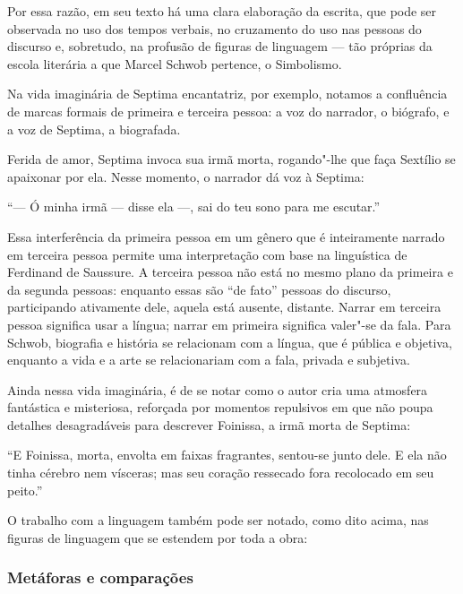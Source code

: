 \documentclass[12pt]{extarticle}
\begin{document}
Por essa razão, em seu texto há uma clara elaboração da escrita, que
pode ser observada no uso dos tempos verbais, no cruzamento do uso nas
pessoas do discurso e, sobretudo, na profusão de figuras de linguagem --- tão próprias da escola literária a que Marcel Schwob pertence, o
Simbolismo.

Na vida imaginária de Septima encantatriz, por exemplo, notamos a
confluência de marcas formais de primeira e terceira pessoa: a voz do narrador, o
biógrafo, e a voz de Septima, a biografada.

Ferida de amor, Septima invoca sua irmã morta, rogando"-lhe que faça
Sextílio se apaixonar por ela. Nesse momento, o narrador dá voz à
Septima:

\smallskip
``--- Ó minha irmã --- disse ela ---, sai do teu sono para me escutar.''
\smallskip

Essa interferência da primeira pessoa em um gênero que é inteiramente
narrado em terceira pessoa permite uma interpretação com base na
linguística de Ferdinand de Saussure. A terceira pessoa não está no
mesmo plano da primeira e da segunda pessoas: enquanto essas são ``de
fato'' pessoas do discurso, participando ativamente dele, aquela está
ausente, distante. Narrar em terceira pessoa significa usar a língua;
narrar em primeira significa valer"-se da fala. Para Schwob, biografia e
história se relacionam com a língua, que é pública e objetiva, enquanto
a vida e a arte se relacionariam com a fala, privada e subjetiva.

Ainda nessa vida imaginária, é de se notar como o autor cria uma
atmosfera fantástica e misteriosa, reforçada por momentos repulsivos em
que não poupa detalhes desagradáveis para descrever Foinissa, a irmã
morta de Septima:

\smallskip
``E Foinissa, morta, envolta em faixas fragrantes, sentou-se junto dele.
E ela não tinha cérebro nem vísceras; mas seu coração ressecado fora
recolocado em seu peito.''
\smallskip

O trabalho com a linguagem também pode ser notado, como dito acima, nas
figuras de linguagem que se estendem por toda a obra:

\subsubsection{Metáforas e comparações}
\end{document}
